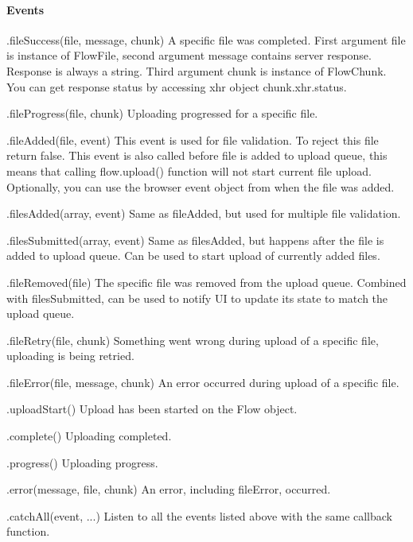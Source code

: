 \paragraph*{Events}


\begin{DoxyItemize}
\item {\ttfamily .file\+Success(file, message, chunk)} A specific file was completed. First argument {\ttfamily file} is instance of {\ttfamily Flow\+File}, second argument {\ttfamily message} contains server response. Response is always a string. Third argument {\ttfamily chunk} is instance of {\ttfamily Flow\+Chunk}. You can get response status by accessing xhr object {\ttfamily chunk.\+xhr.\+status}.
\item {\ttfamily .file\+Progress(file, chunk)} Uploading progressed for a specific file.
\item {\ttfamily .file\+Added(file, event)} This event is used for file validation. To reject this file return false. This event is also called before file is added to upload queue, this means that calling {\ttfamily flow.\+upload()} function will not start current file upload. Optionally, you can use the browser {\ttfamily event} object from when the file was added.
\item {\ttfamily .files\+Added(array, event)} Same as file\+Added, but used for multiple file validation.
\item {\ttfamily .files\+Submitted(array, event)} Same as files\+Added, but happens after the file is added to upload queue. Can be used to start upload of currently added files.
\item {\ttfamily .file\+Removed(file)} The specific file was removed from the upload queue. Combined with files\+Submitted, can be used to notify UI to update its state to match the upload queue.
\item {\ttfamily .file\+Retry(file, chunk)} Something went wrong during upload of a specific file, uploading is being retried.
\item {\ttfamily .file\+Error(file, message, chunk)} An error occurred during upload of a specific file.
\item {\ttfamily .upload\+Start()} Upload has been started on the Flow object.
\item {\ttfamily .complete()} Uploading completed.
\item {\ttfamily .progress()} Uploading progress.
\item {\ttfamily .error(message, file, chunk)} An error, including file\+Error, occurred.
\item {\ttfamily .catch\+All(event, ...)} Listen to all the events listed above with the same callback function.
\end{DoxyItemize}

